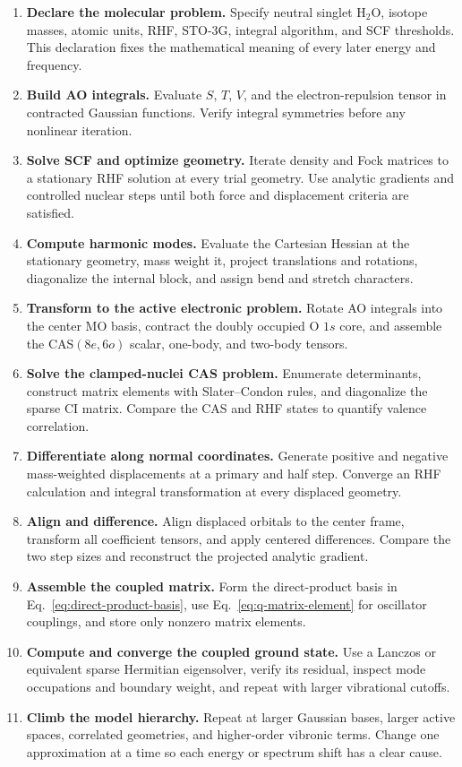 \documentclass[10pt,twocolumn]{article}
\begin{document}
\begin{enumerate}[leftmargin=1.35em,itemsep=2pt]
\item \textbf{Declare the molecular problem.}  Specify neutral singlet
H$_2$O, isotope masses, atomic units, RHF, STO-3G, integral algorithm, and SCF
thresholds.  This declaration fixes the mathematical meaning of every later
energy and frequency.
\item \textbf{Build AO integrals.}  Evaluate $S$, $T$, $V$, and the
electron-repulsion tensor in contracted Gaussian functions.  Verify integral
symmetries before any nonlinear iteration.
\item \textbf{Solve SCF and optimize geometry.}  Iterate density and Fock
matrices to a stationary RHF solution at every trial geometry.  Use analytic
gradients and controlled nuclear steps until both force and displacement
criteria are satisfied.
\item \textbf{Compute harmonic modes.}  Evaluate the Cartesian Hessian at the
stationary geometry, mass weight it, project translations and rotations,
diagonalize the internal block, and assign bend and stretch characters.
\item \textbf{Transform to the active electronic problem.}  Rotate AO
integrals into the center MO basis, contract the doubly occupied O $1s$ core,
and assemble the CAS$(8e,6o)$ scalar, one-body, and two-body tensors.
\item \textbf{Solve the clamped-nuclei CAS problem.}  Enumerate determinants,
construct matrix elements with Slater--Condon rules, and diagonalize the sparse
CI matrix.  Compare the CAS and RHF states to quantify valence correlation.
\item \textbf{Differentiate along normal coordinates.}  Generate positive
and negative mass-weighted displacements at a primary and half step.  Converge
an RHF calculation and integral transformation at every displaced geometry.
\item \textbf{Align and difference.}  Align displaced orbitals to the center
frame, transform all coefficient tensors, and apply centered differences.
Compare the two step sizes and reconstruct the projected analytic gradient.
\item \textbf{Assemble the coupled matrix.}  Form the direct-product basis in
Eq.~\eqref{eq:direct-product-basis}, use Eq.~\eqref{eq:q-matrix-element} for
oscillator couplings, and store only nonzero matrix elements.
\item \textbf{Compute and converge the coupled ground state.}  Use a Lanczos
or equivalent sparse Hermitian eigensolver, verify its residual, inspect mode
occupations and boundary weight, and repeat with larger vibrational cutoffs.
\item \textbf{Climb the model hierarchy.}  Repeat at larger Gaussian bases,
larger active spaces, correlated geometries, and higher-order vibronic terms.
Change one approximation at a time so each energy or spectrum shift has a
clear cause.
\end{enumerate}
\end{document}
